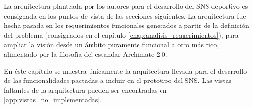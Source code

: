La arquitectura planteada por los autores para el desarrollo del SNS deportivo es consignada en los puntos de vista de las secciones siguientes. La arquitectura fue hecha pasada en los requerimientos funcionales generados a partir de la definición del problema (consignados en el capítulo \ref{chap:analisis_requerimientos}), para ampliar la visión desde un ámbito puramente funcional a otro más rico, alimentado por la filosofía del estandar Archimate 2.0.

En éste capítulo se muestra únicamente la arquitectura llevada para el desarrollo de las funcionalidades pactadas a incluir en el prototipo del SNS. Las vistas faltantes de la arquitectura pueden ser encontradas en \ref{app:vistas_no_implementadas}.

